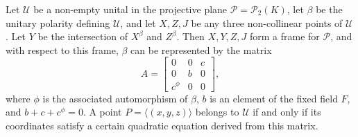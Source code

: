 Let $\mathcal{U}$ be a non-empty unital in the projective plane $\mathcal{P} = \mathcal{P}_2(K)$, let $\beta$ be the unitary polarity defining $\mathcal{U}$, and let $X, Z, J$ be any three non-collinear points of $\mathcal{U}$. Let $Y$ be the intersection of $X^{\beta}$ and $Z^{\beta}$. Then $X, Y, Z, J$ form a frame for $\mathcal{P}$, and with respect to this frame, $\beta$ can be represented by the matrix
$$A = \begin{bmatrix} 0 & 0 & c \\ 0 & b & 0 \\ c^{\phi} & 0 & 0 \end{bmatrix},$$
where $\phi$ is the associated automorphism of $\beta$, $b$ is an element of the fixed field $F$, and $b + c + c^{\phi} = 0$. A point $P = \langle (x, y, z) \rangle$ belongs to $\mathcal{U}$ if and only if its coordinates satisfy a certain quadratic equation derived from this matrix.
